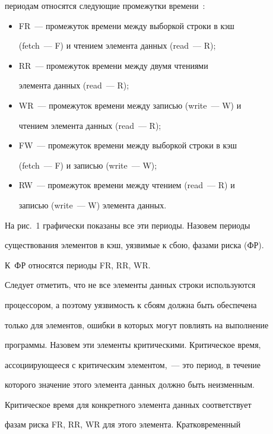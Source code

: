периодам относятся следующие промежутки времени~\cite{2ss}:

    \begin{itemize}

\item FR~--- промежуток времени между выборкой строки в кэш 

({fetch}~--- F) и чтением элемента данных ({read}~--- R);

\item RR~--- промежуток времени между двумя чтениями 

элемента данных ({read}~--- R);

\item WR~--- промежуток времени между записью ({write}~--- W) и 

чтением элемента данных ({read}~--- R);

\item FW~--- промежуток времени между выборкой строки в кэш 

({fetch}~--- F) и записью ({write}~--- W);

\item RW~--- промежуток времени между чтением ({read}~--- R) и 

записью ({write}~--- W) элемента данных.

\end{itemize}

    

    На рис.~1 графически показаны все эти периоды. Назовем периоды 

существования элементов в кэш, уязвимые к сбою, фазами риска (ФР). 

К~ФР относятся периоды FR, RR, WR.

    

    Следует отметить, что не все элементы данных строки используются 

процессором, а поэтому уязвимость к сбоям должна быть обеспечена 

только для элементов, ошибки в которых могут повлиять на выполнение 

программы. Назовем эти элементы критическими. Критическое время, 

ассоциирующееся с критическим элементом,~--- это период, в течение 

которого значение этого элемента данных должно быть неизменным. 

Критическое время для конкретного элемента данных соответствует 

фазам риска FR, RR, WR для этого элемента. Кратковременный 


